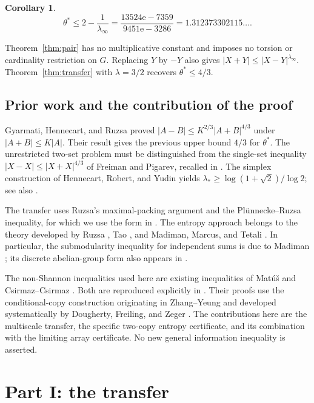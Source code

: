 \documentclass[11pt]{amsart}
\newtheorem{corollary}[theorem]{Corollary}
\theoremstyle{definition}
\theoremstyle{remark}
\numberwithin{equation}{section}
\newcommand{\e}{\mathrm{e}}
\newcommand{\lamI}{\lambda_\infty}
\newcommand{\lsup}{\lambda_*}
\begin{document}
\begin{corollary}\label{cor:theta}
\[
 \theta^*\le 2-\frac1{\lamI}
 =\frac{13524\e-7359}{9451\e-3286}=1.312373302115\ldots.
\]
\end{corollary}

Theorem~\ref{thm:pair} has no multiplicative constant and imposes
no torsion or cardinality restriction on $G$. Replacing $Y$ by $-Y$
also gives $|X+Y|\le|X-Y|^{\lamI}$. Theorem~\ref{thm:transfer}
with $\lambda=3/2$ recovers $\theta^*\le4/3$.

\subsection{Prior work and the contribution of the proof}
Gyarmati, Hennecart, and Ruzsa \cite[Corollary~3]{GHR} proved
$|A-B|\le K^{2/3}|A+B|^{4/3}$ under $|A+B|\le K|A|$.
Their result gives the previous upper bound $4/3$ for $\theta^*$.
The unrestricted two-set problem must be distinguished from the
single-set inequality $|X-X|\le|X+X|^{4/3}$ of Freiman and Pigarev,
recalled in \cite[\S1]{GHR}. The simplex construction of
Hennecart, Robert, and Yudin \cite{HRY} yields
$\lsup\ge\log(1+\sqrt2)/\log2$; see also \cite[\S2]{GHR}.

The transfer uses Ruzsa's maximal-packing argument \cite{Ru99}
and the Pl\"unnecke--Ruzsa inequality, for which we use the form
in \cite[Theorem~1.2]{Pet12}. The entropy approach belongs to the
theory developed by Ruzsa \cite{Ru09}, Tao \cite{Tao10}, and
Madiman, Marcus, and Tetali \cite{Mad08,MMT12}. In particular, the
submodularity inequality for independent sums is due to Madiman
\cite{Mad08}; its discrete abelian-group form also appears in
\cite[Corollary~2.6]{MMT12}.

The non-Shannon inequalities used here are existing inequalities
of Mat\'u\v{s} \cite{Mat07} and Csirmaz--Csirmaz \cite{CC}.
Both are reproduced explicitly in \cite[Theorem~22 and (31)]{CC}.
Their proofs use the conditional-copy construction originating
in Zhang--Yeung \cite{ZY98} and developed systematically by
Dougherty, Freiling, and Zeger \cite{DFZ11}.
The contributions here are the multiscale transfer, the specific
two-copy entropy certificate, and its combination with the limiting
array certificate. No new general information inequality is asserted.

\section{Part I: the transfer}\label{sec:transfer}
\end{document}
